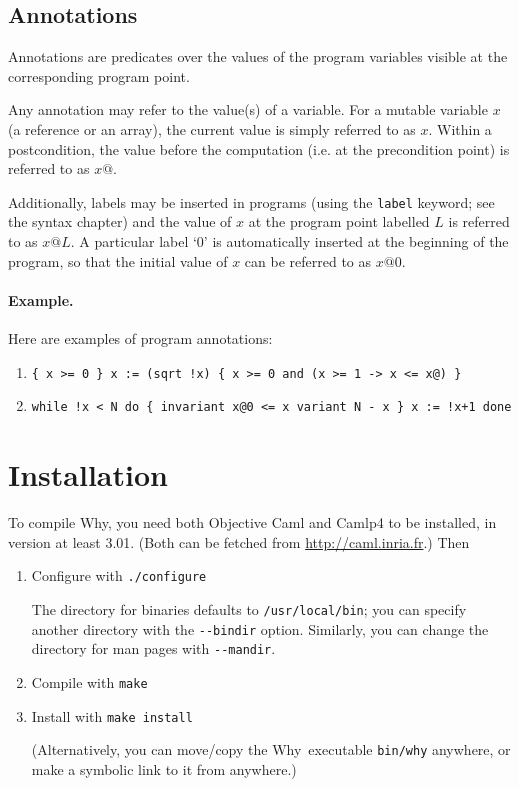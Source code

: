 \documentclass[a4paper,12pt]{report}
\newcommand{\why}{\textsf{Why}}
\newcommand{\te}[1]{\texttt{#1}}
\begin{document}
\subsection{Annotations}

Annotations are predicates over the values of the program variables
visible at the corresponding program point.

Any annotation may refer to the value(s) of a variable.  For a mutable
variable $x$ (a reference or an array), the current value is simply
referred to as $x$. Within a postcondition, the value before the
computation (i.e. at the precondition point) is referred to as $x@$.

Additionally, labels may be inserted in programs (using the 
\te{label} keyword; see the syntax chapter) and the value of $x$ at the
program point labelled $L$ is referred to as $x@L$.
A particular label `0' is automatically inserted at the beginning of the 
program, so that the initial value of $x$ can be referred to as $x@0$.

\paragraph{Example.} Here are examples of program annotations:
\begin{enumerate}
\item
  \verb#{ x >= 0 } x := (sqrt !x) { x >= 0 and (x >= 1 -> x <= x@) }# 
\item
  \verb#while !x < N do { invariant x@0 <= x variant N - x } x := !x+1 done#
\end{enumerate}


\section{Installation}

To compile \why, you need both \textsf{Objective Caml} and
\textsf{Camlp4} to be installed, in version at least 3.01. (Both can
be fetched from \url{http://caml.inria.fr}.)
Then 

\begin{enumerate}
\item Configure with \texttt{./configure}

  The directory for binaries defaults to \texttt{/usr/local/bin}; you
  can specify another directory with the \texttt{-{}-bindir}
  option. Similarly, you can change the directory for man pages with
  \texttt{-{}-mandir}.

\item Compile with \texttt{make}

\item Install with \texttt{make install}

  (Alternatively, you can move/copy the \why\ executable
  \texttt{bin/why} anywhere, or make a symbolic link to it from anywhere.)
\end{enumerate}
\end{document}
